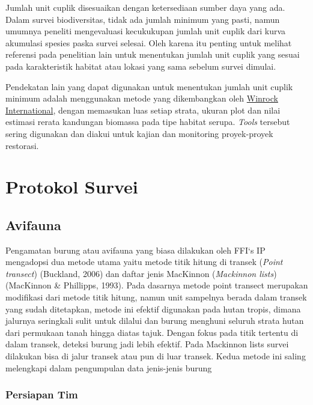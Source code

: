 \documentclass[
  oneside]{book}
\begin{document}
Jumlah unit cuplik disesuaikan dengan ketersediaan sumber daya yang ada. Dalam survei biodiversitas, tidak ada jumlah minimum yang pasti, namun umumnya peneliti mengevaluasi kecukukupan jumlah unit cuplik dari kurva akumulasi spesies paska survei selesai. Oleh karena itu penting untuk melihat referensi pada penelitian lain untuk menentukan jumlah unit cuplik yang sesuai pada karakteristik habitat atau lokasi yang sama sebelum survei dimulai.

Pendekatan lain yang dapat digunakan untuk menentukan jumlah unit cuplik minimum adalah menggunakan metode yang dikembangkan oleh \href{https://winrock.org/document/winrock-sample-plot-calculator-spreadsheet-tool/}{Winrock International}, dengan memasukan luas setiap strata, ukuran plot dan nilai estimasi rerata kandungan biomassa pada tipe habitat serupa. \emph{Tools} tersebut sering digunakan dan diakui untuk kajian dan monitoring proyek-proyek restorasi.

\hypertarget{protokol-survei}{%
\chapter*{Protokol Survei}\label{protokol-survei}}

\hypertarget{avifauna}{%
\section*{Avifauna}\label{avifauna}}

Pengamatan burung atau avifauna yang biasa dilakukan oleh FFI`s IP mengadopsi dua metode utama yaitu metode titik hitung di transek (\emph{Point transect}) (Buckland, 2006) dan daftar jenis MacKinnon (\emph{Mackinnon lists}) (MacKinnon \& Phillipps, 1993). Pada dasarnya metode point transect merupakan modifikasi dari metode titik hitung, namun unit sampelnya berada dalam transek yang sudah ditetapkan, metode ini efektif digunakan pada hutan tropis, dimana jalurnya seringkali sulit untuk dilalui dan burung menghuni seluruh strata hutan dari permukaan tanah hingga diatas tajuk. Dengan fokus pada titik tertentu di dalam transek, deteksi burung jadi lebih efektif. Pada Mackinnon lists survei dilakukan bisa di jalur transek atau pun di luar transek. Kedua metode ini saling melengkapi dalam pengumpulan data jenis-jenis burung

\hypertarget{persiapan-tim}{%
\subsection*{Persiapan Tim}\label{persiapan-tim}}
\end{document}
